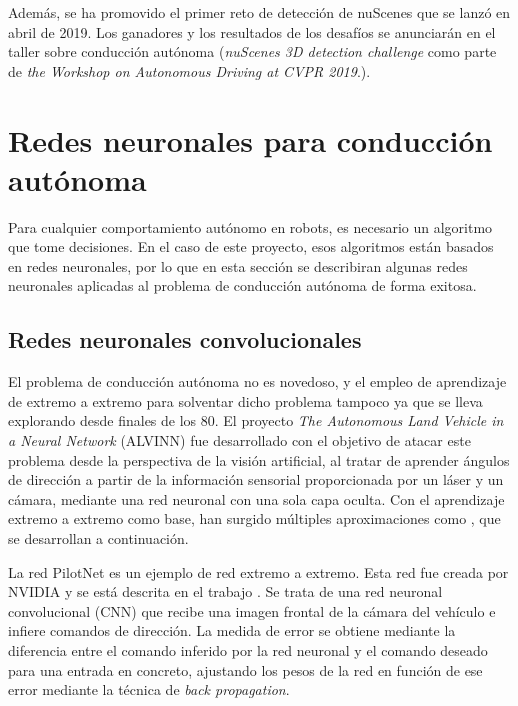 Además, se ha promovido el primer reto de detección de nuScenes que se lanzó en abril de 2019. Los ganadores y los resultados de los desafíos se anunciarán en el taller sobre conducción autónoma (\textit{nuScenes 3D detection challenge} como parte de \textit{the Workshop on Autonomous Driving at CVPR 2019}.).

\section{Redes neuronales para conducción autónoma}
\label{sec:nets}

Para cualquier comportamiento autónomo en robots, es necesario un algoritmo que tome decisiones. En el caso de este proyecto, esos algoritmos están basados en redes neuronales, por lo que en esta sección se describiran algunas redes neuronales aplicadas al problema de conducción autónoma de forma exitosa.

\subsection{Redes neuronales convolucionales}

El problema de conducción autónoma no es novedoso, y el empleo de aprendizaje de extremo a extremo para solventar dicho problema tampoco ya que se lleva explorando desde finales de los 80. El proyecto \textit{The Autonomous Land Vehicle in a Neural Network} (ALVINN) \cite{alvinn} fue desarrollado con el objetivo de atacar este problema desde la perspectiva de la visión artificial, al tratar de aprender ángulos de dirección a partir de la información sensorial proporcionada por un láser y un cámara, mediante una red neuronal con una sola capa oculta. Con el aprendizaje extremo a extremo como base, han surgido múltiples aproximaciones como \cite{road} \cite{end2end} \cite{interpretable}, que se desarrollan a continuación.

La red PilotNet \cite{end2end} \cite{explaining-end2end} es un ejemplo de red extremo a extremo. Esta red fue creada por NVIDIA y se está descrita en el trabajo \cite{end2end}. Se trata de una red neuronal convolucional (CNN) que recibe una imagen frontal de la cámara del vehículo e infiere comandos de dirección. La medida de error se obtiene mediante la diferencia entre el comando inferido por la red neuronal y el comando deseado para una entrada en concreto, ajustando los pesos de la red en función de ese error mediante la técnica de \textit{back propagation}.


